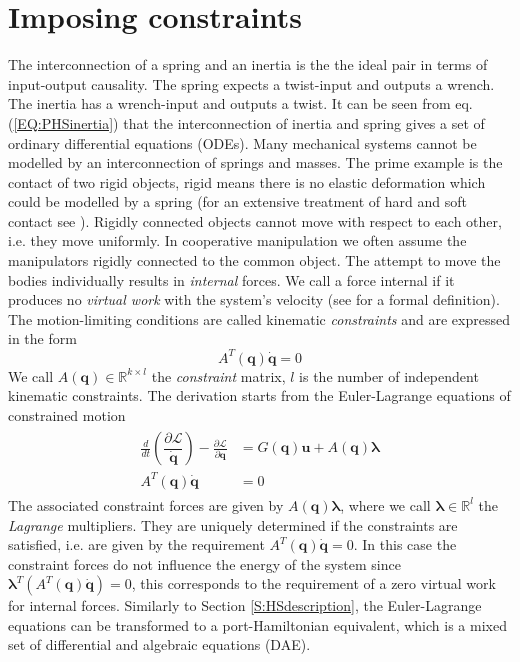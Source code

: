 \documentclass[a4paper,twoside, openright,12pt]{report}
\newcommand{\f}[1]{\boldsymbol{#1}}
\begin{document}
\section{Imposing constraints}\label{S:ImposingConstraints}
The interconnection of a spring and an inertia is the the ideal pair in terms of input-output causality. The spring expects a twist-input and outputs a wrench. The inertia has a wrench-input and outputs a twist. It can be seen from eq. (\ref{EQ:PHSinertia}) that the interconnection of inertia and spring gives a set of ordinary differential equations (ODEs). Many mechanical systems cannot be modelled by an interconnection of springs and masses. The prime example is the contact of two rigid objects, rigid means there is no elastic deformation which could be modelled by a spring (for an extensive treatment of hard and soft contact see \cite{Duindam_09}). Rigidly connected objects cannot move with respect to each other, i.e. they move uniformly. In cooperative manipulation we often assume the manipulators rigidly connected to the common object. The attempt to  move the bodies individually results in \emph{internal} forces. We call a force internal if it produces no \emph{virtual work} with the system's velocity (see \cite{Erhart_16} for a formal definition). The motion-limiting conditions are called kinematic \emph{constraints} and are expressed in the form
\begin{equation}
A^T(\f{q})\dot{\f{q}}=0
\end{equation}
We call $A(\f{q}) \in \mathbb{R}^{k \times l}$ the \emph{constraint} matrix, $l$ is the number of independent kinematic constraints. The derivation starts from the Euler-Lagrange equations of constrained motion \cite{duindam2009geoplexbook}
\begin{eqnarray}
\begin{aligned}
\frac{d}{dt}\left(\dfrac{\partial \mathcal{L}}{\dot{\f{q}}}\right) - \frac{\partial \mathcal{L}}{\partial \f{q}} &= G(\f{q})\f{u} + A(\f{q})\boldsymbol{\lambda}
\\
A^T(\f{q})\dot{\f{q}} &= 0
\end{aligned}
\end{eqnarray}
The associated constraint forces are given by $A(\f{q})\boldsymbol{\lambda}$, where we call $\boldsymbol{\lambda} \in  \mathbb{R}^l$ the \emph{Lagrange} multipliers. They are uniquely determined if the constraints are satisfied, i.e. are given by the requirement $A^T(\f{q})\dot{\f{q}}=0$. In this case the constraint forces do not influence the energy of the system since $\boldsymbol{\lambda}^T (A^T(\f{q})\dot{\f{q}}) = 0$, this corresponds to the requirement of a zero virtual work for internal forces. Similarly to Section \ref{S:HSdescription}, the Euler-Lagrange equations can be transformed to a port-Hamiltonian equivalent, which is a mixed set of differential and algebraic equations (DAE).
\end{document}

